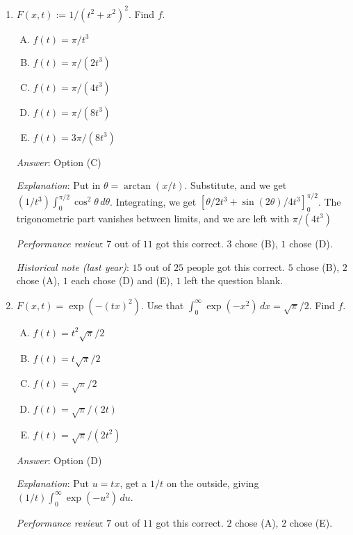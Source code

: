 \documentclass[10pt]{amsart}
\begin{document}
\begin{enumerate}
  {\em Performance review}: Everybody got this correct.

  {\em Historical note (last year)}: $17$ out of $25$ got this correct. $5$
  chose (B), $2$ chose (D), $1$ chose (C).

\item $F(x,t) := 1/(t^2 + x^2)^2$. Find $f$.

  \begin{enumerate}[(A)]
  \item $f(t) = \pi/t^3$
  \item $f(t) = \pi/(2t^3)$
  \item $f(t) = \pi/(4t^3)$
  \item $f(t) = \pi/(8t^3)$
  \item $f(t) = 3\pi/(8t^3)$
  \end{enumerate}

  {\em Answer}: Option (C)

  {\em Explanation}: Put in $\theta = \arctan(x/t)$. Substitute, and
  we get $(1/t^3) \int_0^{\pi/2} \cos^2\theta \,
  d\theta$. Integrating, we get $[\theta/2t^3 +
  \sin(2\theta)/4t^3]_0^{\pi/2}$. The trigonometric part vanishes
  between limits, and we are left with $\pi/(4t^3)$

  {\em Performance review}: $7$ out of $11$ got this correct. $3$
  chose (B), $1$ chose (D).

  {\em Historical note (last year)}: $15$ out of $25$ people got this
  correct. $5$ chose (B), $2$ chose (A), $1$ each chose (D) and (E),
  $1$ left the question blank.
\item $F(x,t) = \exp(-(tx)^2)$. Use that $\int_0^\infty \exp(-x^2) \, dx=
  \sqrt{\pi}/2$. Find $f$.

  \begin{enumerate}[(A)]
  \item $f(t) = t^2\sqrt{\pi}/2$
  \item $f(t) = t\sqrt{\pi}/2$
  \item $f(t) = \sqrt{\pi}/2$
  \item $f(t) = \sqrt{\pi}/(2t)$
  \item $f(t) = \sqrt{\pi}/(2t^2)$
  \end{enumerate}

  {\em Answer}: Option (D)

  {\em Explanation}: Put $u = tx$, get a $1/t$ on the outside, giving
  $(1/t) \int_0^\infty \exp(-u^2) \, du$.

  {\em Performance review}: $7$ out of $11$ got this correct. $2$
  chose (A), $2$ chose (E).


\end{enumerate}
\end{document}
